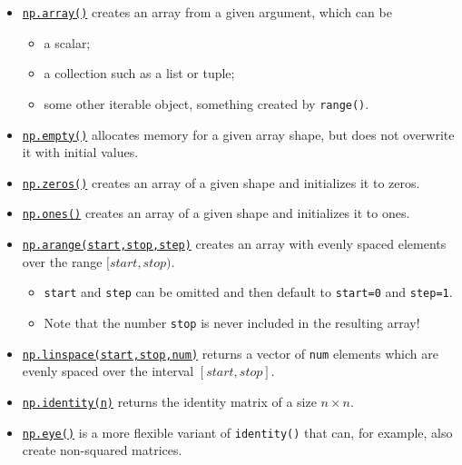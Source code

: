 \documentclass{scrartcl}
\providecommand{\tightlist}{%
      \setlength{\itemsep}{0pt}\setlength{\parskip}{0pt}}
\begin{document}
\begin{itemize}
\tightlist
\item
  \href{https://numpy.org/doc/stable/reference/generated/numpy.array.html}{\texttt{np.array()}}
  creates an array from a given argument, which can be

  \begin{itemize}
  \tightlist
  \item
    a scalar;
  \item
    a collection such as a list or tuple;
  \item
    some other iterable object, \eg something created by
    \texttt{range()}.
  \end{itemize}
\item
  \href{https://numpy.org/doc/stable/reference/generated/numpy.empty.html}{\texttt{np.empty()}}
  allocates memory for a given array shape, but does not overwrite it
  with initial values.
\item
  \href{https://numpy.org/doc/stable/reference/generated/numpy.zeros.html}{\texttt{np.zeros()}}
  creates an array of a given shape and initializes it to zeros.
\item
  \href{https://numpy.org/doc/stable/reference/generated/numpy.ones.html}{\texttt{np.ones()}}
  creates an array of a given shape and initializes it to ones.
\item
  \href{https://numpy.org/doc/stable/reference/generated/numpy.arange.html}{\texttt{np.arange(start,stop,step)}}
  creates an array with evenly spaced elements over the range
  \([start,stop)\).

  \begin{itemize}
  \tightlist
  \item
    \texttt{start} and \texttt{step} can be omitted and then default to
    \texttt{start=0} and \texttt{step=1}.
  \item
    Note that the number \texttt{stop} is never included in the
    resulting array!
  \end{itemize}
\item
  \href{https://numpy.org/doc/stable/reference/generated/numpy.linspace.html}{\texttt{np.linspace(start,stop,num)}}
  returns a vector of \texttt{num} elements which are evenly spaced over
  the interval \([start,stop]\).
\item
  \href{https://numpy.org/doc/stable/reference/generated/numpy.identity.html}{\texttt{np.identity(n)}}
  returns the identity matrix of a size \(n \times n\).
\item
  \href{https://numpy.org/doc/stable/reference/generated/numpy.eye.html}{\texttt{np.eye()}}
  is a more flexible variant of \texttt{identity()} that can, for
  example, also create non-squared matrices.
\end{itemize}
\end{document}
